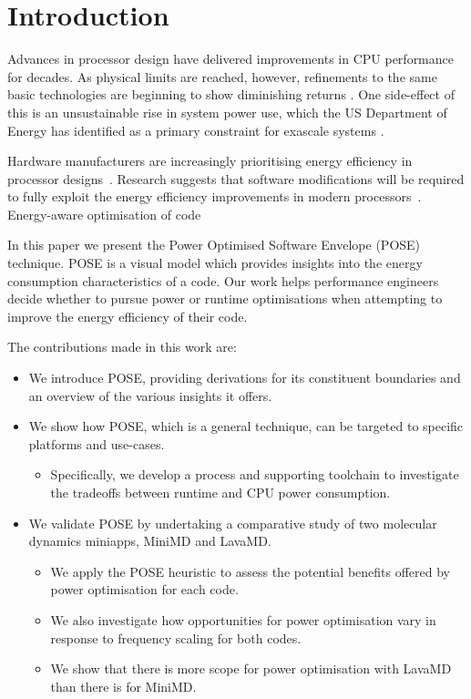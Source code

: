 \section{Introduction}
Advances in processor design have delivered improvements in CPU performance for decades. As physical limits are reached, however, refinements to the same basic technologies are beginning to show diminishing returns \cite{esmaeilzadeh:2011aa}. One side-effect of this is an unsustainable rise in system power use, which the US Department of Energy has identified as a primary constraint for exascale systems \cite{shalf:2011aa}.

Hardware manufacturers are increasingly prioritising energy efficiency in processor designs~\cite{kurd:2014aa}. 
Research suggests that software modifications will be required to fully exploit the energy efficiency improvements in modern processors~\cite{shao:2013aa}.
Energy-aware optimisation of code 

In this paper we present the Power Optimised Software Envelope (POSE) technique.
POSE is a visual model which provides insights into the energy consumption characteristics of a code.
Our work helps performance engineers decide whether to pursue power or runtime optimisations when attempting to improve the energy efficiency of their code.

\medskip \noindent
The contributions made in this work are:
\begin{itemize}
  \item We introduce POSE, providing derivations for its constituent boundaries and an overview of the various insights it offers.
  \item We show how POSE, which is a general technique, can be targeted to specific platforms and use-cases. 
  \begin{itemize}
    \item Specifically, we develop a process and supporting toolchain to investigate the tradeoffs between runtime and CPU power consumption.
  \end{itemize}
  \item We validate POSE by undertaking a comparative study of two molecular dynamics miniapps, MiniMD and LavaMD.
  \begin{itemize}
    \item We apply the POSE heuristic to assess the potential benefits offered by power optimisation for each code.
    \item We also investigate how opportunities for power optimisation vary in response to frequency scaling for both codes.
    \item We show that there is more scope for power optimisation with LavaMD than there is for MiniMD.
  \end{itemize}
\end{itemize}

